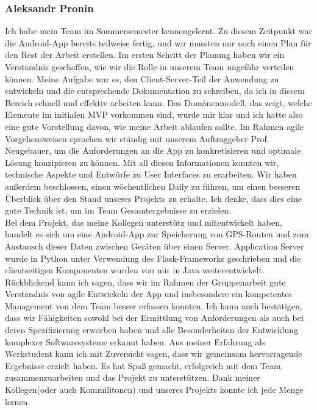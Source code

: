 \documentclass[10pt]{article}
\begin{document}
\subsubsection{Aleksandr Pronin}
    Ich habe mein Team im Sommersemester kennengelernt. Zu diesem Zeitpunkt war die Android-App bereits teilweise fertig, 
    und wir mussten nur noch einen Plan für den Rest der Arbeit erstellen.
    Im ersten Schritt der Planung haben wir ein Verständnis geschaffen, wie wir die Rolle in unserem Team ungefähr verteilen können. 
    Meine Aufgabe war es, den Client-Server-Teil der Anwendung zu entwickeln und die entsprechende Dokumentation zu schreiben,
    da ich in diesem Bereich schnell und effektiv arbeiten kann.
    Das Domänenmodell, das zeigt, welche Elemente im initialen MVP vorkommen sind, wurde mir klar und ich hatte also eine gute Vorstellung
    davon, wie meine Arbeit ablaufen sollte.  Im Rahmen agile Vorgehensweisen sprachen wir ständig mit unserem Auftraggeber Prof. Neugebauer, 
    um die Anforderungen an die App zu konkretisieren und optimale Lösung konzipieren zu können. Mit all diesen Informationen konnten wir,
    technische Aspekte und Entwürfe zu User Interfaces zu erarbeiten. Wir haben außerdem beschlossen, einen wöchentlichen Daily zu führen, 
    um einen besseren Überblick über den Stand unseres Projekts zu erhalte. Ich denke, dass dies eine gute Technik ist, um im Team Gesamtergebnisse 
    zu erzielen. \\
    Bei dem Projekt, das meine Kollegen unterstütz und mitentwickelt haben, handelt es sich um eine Android-App zur 
    Speicherung von GPS-Routen und zum Austausch dieser Daten zwischen Geräten über einen Server. Application Server wurde
    in Python unter Verwendung des Flask-Frameworks geschrieben und die clientseitigen Komponenten wurden von mir 
    in Java weiterentwickelt. Rückblickend kann ich sagen, dass wir im Rahmen der Gruppenarbeit  gute Verständnis von agile 
    Entwickeln der App  und insbesondere ein kompetentes Management von dem Team besser erfassen konnten. Ich kann auch bestätigen,
    dass wir Fähigkeiten sowohl bei der Ermittlung von Anforderungen als auch bei deren Spezifizierung erworben haben und alle
    Besonderheiten der Entwicklung komplexer Softwaresysteme erkannt haben. Aus meiner Erfahrung als Werkstudent kann ich mit Zuversicht sagen,
    dass wir gemeinsam hervorragende Ergebnisse erzielt haben. Es hat Spaß gemacht, erfolgreich mit dem Team zusammenzuarbeiten und das Projekt zu 
    unterstützen. Dank meiner Kollegen(oder auch Kommilitonen) und unseres Projekts konnte ich jede Menge lernen.
\end{document}
